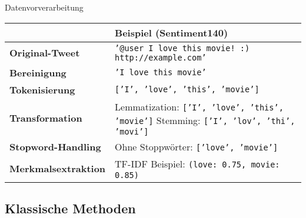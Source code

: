 \documentclass[aspectratio=169]{beamer} %
\begin{document}
\begin{frame}{Datenvorverarbeitung}
  \fontsize{10pt}{12pt}\selectfont
  \vspace{0.3cm}

 \begin{table}[]
      \centering
      \renewcommand{\arraystretch}{1.2}
      \begin{tabular}{l|p{7.5cm}}
          \hline
          & \textbf{Beispiel (Sentiment140)} \\
          \hline
          \textbf{Original-Tweet} & \texttt{'@user I love this movie! :) http://example.com'} \\
          \hline
          \textbf{Bereinigung} & \texttt{'I love this movie'} \\
          \hline
          \textbf{Tokenisierung} & \texttt{['I', 'love', 'this', 'movie']} \\
          \hline
          \textbf{Transformation} & Lemmatization: \texttt{['I', 'love', 'this', 'movie']} \newline
          Stemming: \texttt{['I', 'lov', 'thi', 'movi']} \\
          \hline
          \textbf{Stopword-Handling} & Ohne Stoppwörter: \texttt{['love', 'movie']} \\
          \hline
          \textbf{Merkmalsextraktion} & TF-IDF Beispiel: \newline
          \texttt{(love: 0.75, movie: 0.85)} \\
          \hline
      \end{tabular}
  \end{table}

\end{frame}

\subsection{Klassische Methoden}
\end{document}
